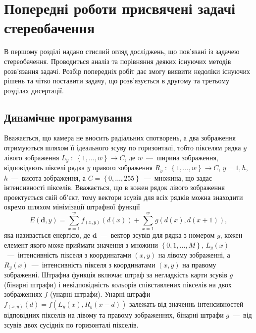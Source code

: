 \chapter{Попередні роботи присвячені задачі стереобачення}

В першому розділі надано стислий огляд досліджень,
що пов'язані із задачею стереобачення.
Проводиться аналіз та порівняння деяких існуючих методів розв'язання задачі.
Розбір попередніх робіт дає змогу виявити недоліки
існуючих рішень та чітко поставити задачу,
що розв'язується в другому та третьому розділах дисертації.

\section{Динамічне програмування}

Вважається, що камера не вносить радіальних спотворень,
а два зображення отримуються шляхом її ідеального зсуву по горизонталі,
тобто пікселям рядка $y$ лівого зображення
$L_y \; : \; \left\{ 1, \dotsc, w \right\} \to C$, де $w$~---~ширина зображення,
відповідають пікселі рядка $y$
правого зображення $R_y \; : \; \left\{ 1, \dotsc, w \right\} \to C$,
$y = \overline{1, h}$, $h$~---~висота зображення,
а $C = \left\{ 0, \dotsc, 255 \right\}$~---~множина,
що задає інтенсивності пікселів.
Вважається, що в кожен рядок лівого зображення проектується свій об'єкт,
тому вектори зсувів для всіх рядків можна знаходити окремо шляхом
мінімізації штрафної функції
\begin{equation}\label{eq:overview:energy}
    E \left(\pmb{d}, y \right)
    = \sum \limits_{x = 1}^{w}
        f_{\left( x, y \right)} \left( d \left( x \right) \right)
    + \sum \limits_{x = 1}^{w}
        g \left(d \left(x \right), d \left( x + 1 \right) \right),
\end{equation}
яка називається енергією,
де $\pmb{d}$~---~вектор зсувів для рядка з номером $y$,
кожен елемент якого може приймати значення з множини
$\left\{ 0, 1, \dotsc, M \right\}$,
$L_y \left( x \right)$~---~інтенсивність пікселя з координатами
$ \left(x, y \right)$ на лівому зображенні,
а $R_y \left( x \right)$~---~інтенсивність пікселя з координатами
$\left( x, y \right)$ на правому зображенні.
Штрафна функція включає штраф за негладкість карти зсувів $g$ (бінарні штрафи)
і невідповідність кольорів співставлених пікселів на двох зображеннях $f$
(унарні штрафи).
Унарні штрафи
$f_{\left( x, y \right)} \left( d \right) = f \left(
    L_y \left(x \right),
    R_y \left( x - d \right)
\right)$ залежать від значеннь
інтенсивностей відповідних пікселів на лівому та правому зображеннях,
бінарні штрафи $g$~---~від зсувів двох сусідніх по горизонталі пікселів.

